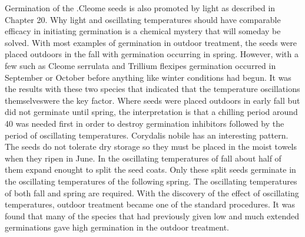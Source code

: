 Germination of the .Cleome seeds is also promoted by light as described in Chapter
20. Why light and oscillating temperatures should have comparable efficacy in
initiating germination is a chemical mystery that will someday be solved.
With most examples of germination in outdoor treatment, the seeds were placed
outdoors in the fall with germination occurring in spring. However, with a few such as
Cleome serrulata and Trillium flexipes germination occurred in September or October
before anything like winter conditions had begun. It was the results with these two
species that indicated that the temperature oscillations themselveswere the key factor.
Where seeds were placed outdoors in early fall but did not germinate until spring, the
interpretation is that a chilling period around 40 was needed first in order to destroy
germination inhibitors followed by the period of oscillating temperatures.
Corydalis nobile has an interesting pattern. The seeds do not tolerate dry
storage so they must be placed in the moist towels when they ripen in June. In the
oscillating temperatures of fall about half of them expand enought to split the seed
coats. Only these split seeds germinate in the oscillating temperatures of the following
spring. The oscillating temperatures of both fall and spring are required.
With the discovery of the effect of oscillating temperatures, outdoor treatment
became one of the standard procedures. It was found that many of the species that
had previously given low and much extended germinations gave high germination in
the outdoor treatment.

